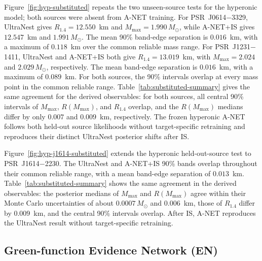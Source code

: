 \documentclass[aps,prd,twocolumn,superscriptaddress,nofootinbib,longbibliography]{revtex4-2}
\begin{document}
Figure~\ref{fig:hyp-substituted} repeats the two
unseen-source tests for the hyperonic model; both sources were absent from
A-NET training. For PSR~J0614$-$3329, UltraNest gives
$R_{1.4}=12.550$~km and $M_{\max}=1.990\,M_\odot$, while A-NET+IS gives
$12.547$~km and $1.991\,M_\odot$. The mean 90\% band-edge separation is
$0.016$~km, with a maximum of $0.118$~km over the common reliable mass
range. For PSR~J1231$-$1411, UltraNest and A-NET+IS both give
$R_{1.4}=13.019$~km, with $M_{\max}=2.024$ and $2.029\,M_\odot$,
respectively. The mean band-edge separation is $0.016$~km, with a maximum of
$0.089$~km. For both sources, the 90\% intervals overlap at every mass point
in the common reliable range. Table~\ref{tab:substituted-summary} gives the
same agreement for the derived observables: for both sources, all central
90\% intervals of $M_{\max}$, $R(M_{\max})$, and $R_{1.4}$ overlap, and the
$R(M_{\max})$ medians differ by only $0.007$ and $0.009$~km, respectively.
The frozen hyperonic A-NET follows both held-out source likelihoods without
target-specific retraining and reproduces their distinct UltraNest posterior
shifts after IS.

Figure~\ref{fig:hyp-j1614-substituted} extends the
hyperonic held-out-source test to PSR~J1614$-$2230. The UltraNest and
A-NET+IS 90\% bands overlap throughout their common reliable range, with a
mean band-edge separation of $0.013$~km. Table~\ref{tab:substituted-summary}
shows the same agreement in the derived observables: the posterior medians of
$M_{\max}$ and $R(M_{\max})$ agree within their Monte Carlo uncertainties of
about $0.0007\,M_\odot$ and $0.006$~km, those of $R_{1.4}$ differ by
$0.009$~km, and the central 90\% intervals overlap. After IS, A-NET reproduces the UltraNest result without
target-specific retraining.

\subsection{Green-function Evidence Network (EN)}
\label{sec:results:evidence-network}
\end{document}
